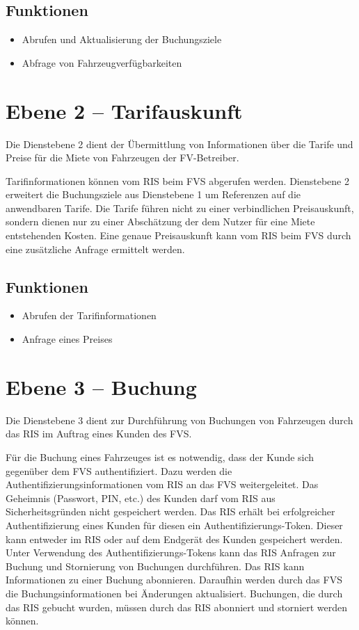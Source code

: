 \subsection*{Funktionen}
\begin{itemize}
\item Abrufen und Aktualisierung der Buchungsziele
\item Abfrage von Fahrzeugverfügbarkeiten
\end{itemize}

\section{Ebene 2 -- Tarifauskunft}
Die Dienstebene 2 dient der Übermittlung von Informationen über die Tarife und Preise für die Miete von Fahrzeugen der FV-Betreiber.

Tarifinformationen können vom RIS beim FVS abgerufen werden. Dienstebene 2 erweitert die Buchungsziele aus Dienstebene 1 um Referenzen auf die anwendbaren Tarife. Die Tarife führen nicht zu einer verbindlichen Preisauskunft, sondern dienen nur zu einer Abschätzung der dem Nutzer für eine Miete entstehenden Kosten. Eine genaue Preisauskunft kann vom RIS beim FVS durch eine zusätzliche Anfrage ermittelt werden.

\subsection*{Funktionen}
\begin{itemize}
\item Abrufen der Tarifinformationen
\item Anfrage eines Preises
\end{itemize}

\section{Ebene 3 -- Buchung}
Die Dienstebene 3 dient zur Durchführung von Buchungen von Fahrzeugen durch das RIS im Auftrag eines Kunden des FVS.

Für die Buchung eines Fahrzeuges ist es notwendig, dass der Kunde sich gegenüber dem FVS authentifiziert. Dazu werden die Authentifizierungsinformationen vom RIS an das FVS weitergeleitet. Das Geheimnis (Passwort, PIN, etc.) des Kunden darf vom RIS aus Sicherheitsgründen nicht gespeichert werden. Das RIS erhält bei erfolgreicher Authentifizierung eines Kunden für diesen ein Authentifizierungs-Token. Dieser kann entweder im RIS oder auf dem Endgerät des Kunden gespeichert werden. Unter Verwendung des Authentifizierungs-Tokens kann das RIS Anfragen zur Buchung und Stornierung von Buchungen durchführen. Das RIS kann Informationen zu einer Buchung abonnieren. Daraufhin werden durch das FVS die Buchungsinformationen bei Änderungen aktualisiert. Buchungen, die durch das RIS gebucht wurden, müssen durch das RIS abonniert und storniert werden können.

